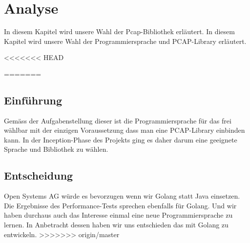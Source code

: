 \chapter{Analyse}
\label{chap:Analyse}

In diesem Kapitel wird unsere Wahl der Pcap-Bibliothek erläutert.
In diesem Kapitel wird unsere Wahl der Programmiersprache und \acs{PCAP}-Library erläutert.

<<<<<<< HEAD


=======
\section{Einführung}
Gemäss der Aufgabenstellung dieser \work ist die Programmiersprache für das \tool frei wählbar mit der einzigen Voraussetzung dass man eine \acs{PCAP}-Library einbinden kann. In der Inception-Phase des Projekts ging es daher darum eine geeignete Sprache und Bibliothek zu wählen.







\section{Entscheidung}
Open Systems AG würde es bevorzugen wenn wir Golang statt Java einsetzen. Die Ergebnisse des Performance-Tests sprechen ebenfalls für Golang. Und wir haben durchaus auch das Interesse einmal eine neue Programmiersprache zu lernen.
In Anbetracht dessen haben wir uns entschieden das \tool mit Golang zu entwickeln.
>>>>>>> origin/master
